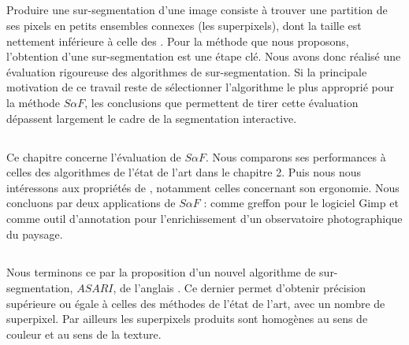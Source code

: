 \subsection*{}
Produire une sur-segmentation d'une image consiste à trouver une partition de ses pixels en petits ensembles connexes (les superpixels), dont la taille est nettement inférieure à celle des . Pour la méthode que nous proposons, l'obtention d'une sur-segmentation est une étape clé. Nous avons donc réalisé une évaluation rigoureuse des algorithmes de sur-segmentation. Si la principale motivation de ce travail reste de sélectionner l'algorithme le plus approprié pour la méthode $S \alpha F$, les conclusions que permettent de tirer cette évaluation dépassent largement le cadre de la segmentation interactive.

\subsection*{}

Ce chapitre concerne l'évaluation de $S \alpha F$. Nous comparons ses performances à celles des algorithmes de l'état de l'art  dans le chapitre 2. Puis nous nous intéressons aux propriétés de , notamment celles concernant son ergonomie. Nous concluons par deux applications de $S \alpha F$ : comme greffon pour le logiciel Gimp et comme outil d'annotation pour l'enrichissement d'un observatoire photographique du paysage.

\subsection*{ }

Nous terminons ce  par la proposition d'un nouvel algorithme de sur-segmentation, $ASARI$, de l'anglais \og \emph{}\fg . Ce dernier permet d'obtenir  précision supérieure ou égale à celles des méthodes de l'état de l'art, avec un nombre  de superpixel. Par ailleurs\modif{,} les superpixels produits sont homogènes au sens de  couleur et au sens de la texture. 

